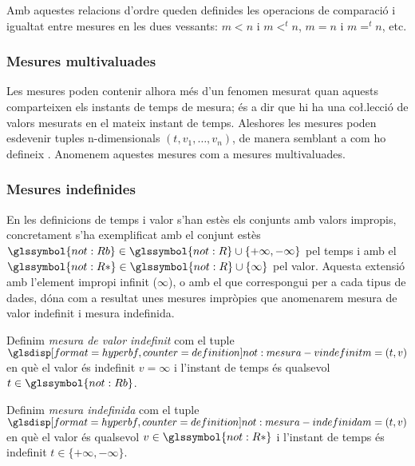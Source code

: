 Amb aquestes relacions d'ordre queden definides les operacions de
comparació i igualtat entre mesures en les dues vessants: $m < n$ i
$m<^t n$, $m=n$ i $m=^t n$, etc.



\subsubsection{Mesures multivaluades}

Les mesures poden contenir alhora més d'un fenomen mesurat quan
aquests comparteixen els instants de temps de mesura; és a dir que hi
ha una co\l.lecció de valors mesurats en el mateix instant de temps.
Aleshores les mesures poden esdevenir tuples n-dimensionals
$(t,v_1,\dotsc,v_n)$, de manera semblant a com ho defineix
\textcite{assfalg08:thesis}.  Anomenem aquestes mesures com a mesures
multivaluades.



\subsubsection{Mesures indefinides}



En les definicions de temps i valor s'han estès els conjunts amb
valors impropis, concretament s'ha exemplificat amb el conjunt estès
 $\glssymbol{not:Rb} \in \glssymbol{not:R} \cup \{+\infty,-\infty\}$
pel temps i amb el $\glssymbol{not:R*}\in\glssymbol{not:R} \cup\{\infty\}$ pel
valor. Aquesta extensió amb l'element impropi infinit ($\infty$), o
amb el que correspongui per a cada tipus de dades, dóna com a resultat
unes mesures impròpies que anomenarem mesura de valor indefinit i
mesura indefinida.

\begin{definition}
  \label{def:model:mesura_valor_indefinit}
  Definim \emph{mesura de valor indefinit} com el tuple
  $\glsdispdef{not:mesura-vindefinit}{m=(t,v)}$ en què el valor és
  indefinit $v=\infty$ i l'instant de temps és qualsevol
  $t\in\glssymbol{not:Rb}$.
\end{definition}

\begin{definition}
  \label{def:model:mesura_indefinida}
  Definim \emph{mesura indefinida} com el tuple
  $\glsdispdef{not:mesura-indefinida}{m=(t,v)}$ en què el valor és
  qualsevol $v\in\glssymbol{not:R*}$ i l'instant de temps és indefinit
  $t\in\{+\infty,-\infty\}$.
\end{definition}

